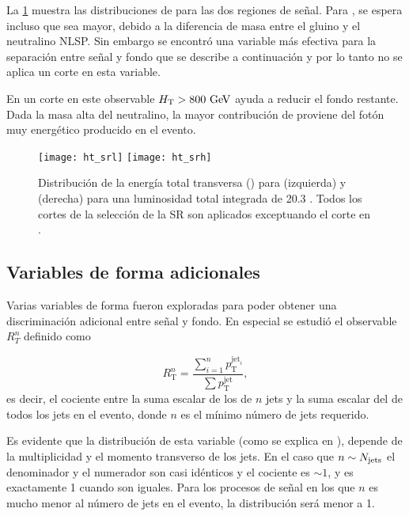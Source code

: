 La \cref{fig:opt_ht} muestra las distribuciones de {\HT} para las dos regiones de señal.
Para {\SRL}, se espera incluso que {\HT} sea mayor, debido a la
diferencia de masa entre el gluino y el neutralino NLSP. Sin embargo
se encontró una variable más efectiva para la separación entre señal y
fondo que se describe a continuación y por lo tanto no se aplica un corte
en esta variable.


En {\SRH} un corte en este observable $\HT>800\gev$ ayuda a reducir el fondo restante.
Dada la masa alta del neutralino, la mayor contribución de {\HT} proviene
del fotón muy energético producido en el evento.


\begin{figure}[!h]
  \centering

  \texttt{[image: ht\_srl]}
  \texttt{[image: ht\_srh]}

  \caption{Distribución de la energía total transversa (\HT) para {\SRL} (izquierda)
    y {\SRH} (derecha) para una luminosidad total integrada de 20.3 \ifb. Todos los cortes de la selección
  de la SR son aplicados exceptuando el corte en {\HT}.}
  \label{fig:opt_ht}
\end{figure}



\subsection{Variables de forma adicionales}\label{sec:shape_vars}

Varias variables de forma fueron exploradas para poder obtener
una discriminación adicional entre señal y fondo. En especial se estudió el
observable $R_T^n$ definido como

\begin{equation}\label{eq:rt_formula}
  R_\mathrm{T}^{n} = \frac{\sum_{i=1}^{n}p_\mathrm{T}^{\text{jet}_i}}{\sum p_\mathrm{T}^{\text{jet}}},
\end{equation}
%
es decir, el cociente entre la suma escalar de los {\pt} de $n$ jets y la suma
escalar del {\pt} de todos los jets en el evento, donde $n$ es el mínimo número
de jets requerido.

Es evidente que la distribución de esta variable (como se explica en
\cite{PhysRevD.84.055010}), depende de la multiplicidad y el momento transverso
de los jets. En el caso que $n \sim N_\mathrm{jets}$ el denominador y el
numerador son casi idénticos y el cociente es $\sim 1$, y es exactamente 1
cuando son iguales.
Para los procesos de señal en los que $n$ es mucho menor al número de jets en el
evento, la distribución será menor a 1.

